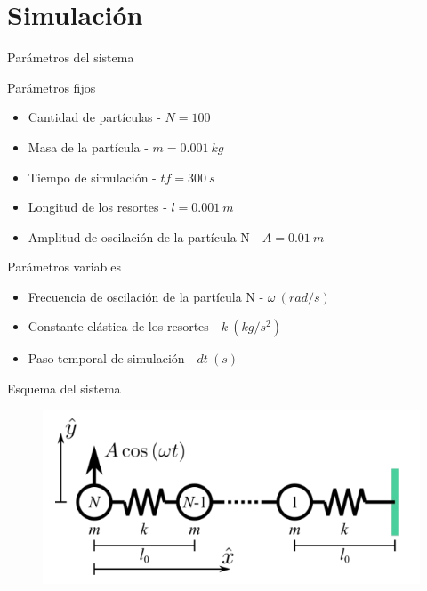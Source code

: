 \section{Simulación}\label{sec:simulacion}

\begin{frame}{Parámetros del sistema}
    \begin{block}{Parámetros fijos}
        \begin{itemize}
            \item Cantidad de partículas - $N = 100$
            \item Masa de la partícula - $m = 0.001\ kg$
            \item Tiempo de simulación - $tf = 300\ s$
            \item Longitud de los resortes - $l = 0.001\ m$
            \item Amplitud de oscilación de la partícula N - $A = 0.01\ m$
        \end{itemize}
    \end{block}
    \begin{block}{Parámetros variables}
        \begin{itemize}
            \item Frecuencia de oscilación de la partícula N - $\omega\ (rad/s)$
            \item Constante elástica de los resortes - $k\ (kg/s^2)$
            \item Paso temporal de simulación - $dt\ (s)$
        \end{itemize}
    \end{block}
\end{frame}

\begin{frame}{Esquema del sistema}
    \begin{figure}[H]
        \centering
        \includegraphics[width=0.8\linewidth]{pic/04-sim/system-schema}\label{fig:figure-system-schema}
    \end{figure}
\end{frame}

